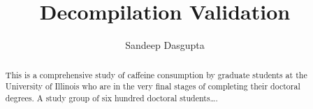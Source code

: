 \documentclass[edeposit,fullpage]{uiucthesis2009}
\begin{document}
\title{Decompilation Validation}
\author{Sandeep Dasgupta}
\phdthesis
{}
\maketitle

\frontmatter

\begin{abstract}
This is a comprehensive study of caffeine consumption by graduate
students at the University of Illinois who are in the very final
stages of completing their doctoral degrees. A study group of six
hundred doctoral students\ldots.
\end{abstract}

%
%

\end{document}
